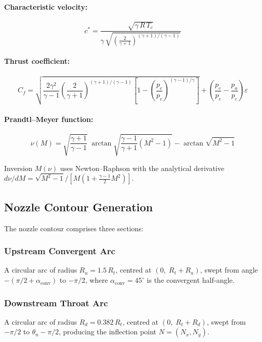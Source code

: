 \documentclass[11pt,a4paper]{article}
\begin{document}
\paragraph{Characteristic velocity:}
\begin{equation}
c^* = \frac{\sqrt{\gamma\,R\,T_c}}{\gamma\,\sqrt{\left(\frac{2}{\gamma+1}\right)^{(\gamma+1)/(\gamma-1)}}}
\end{equation}

\paragraph{Thrust coefficient:}
\begin{equation}
C_f = \sqrt{\frac{2\gamma^2}{\gamma-1}\left(\frac{2}{\gamma+1}\right)^{(\gamma+1)/(\gamma-1)}\left[1-\left(\frac{p_e}{p_c}\right)^{(\gamma-1)/\gamma}\right]} + \left(\frac{p_e}{p_c}-\frac{p_a}{p_c}\right)\varepsilon
\end{equation}

\paragraph{Prandtl--Meyer function:}
\begin{equation}
\nu(M) = \sqrt{\frac{\gamma+1}{\gamma-1}}\;\arctan\!\sqrt{\frac{\gamma-1}{\gamma+1}(M^2-1)} - \arctan\!\sqrt{M^2-1}
\end{equation}

Inversion $M(\nu)$ uses Newton--Raphson with the analytical derivative $d\nu/dM = \sqrt{M^2-1}/[M(1+\frac{\gamma-1}{2}M^2)]$.

\subsection{Nozzle Contour Generation}

The nozzle contour comprises three sections:

\subsubsection{Upstream Convergent Arc}
A circular arc of radius $R_u = 1.5\,R_t$, centred at $(0,\;R_t+R_u)$, swept from angle $-(\pi/2+\alpha_{\text{conv}})$ to $-\pi/2$, where $\alpha_{\text{conv}}=45^\circ$ is the convergent half-angle.

\subsubsection{Downstream Throat Arc}
A circular arc of radius $R_d = 0.382\,R_t$, centred at $(0,\;R_t+R_d)$, swept from $-\pi/2$ to $\theta_n - \pi/2$, producing the inflection point $N=(N_x, N_y)$.
\end{document}
